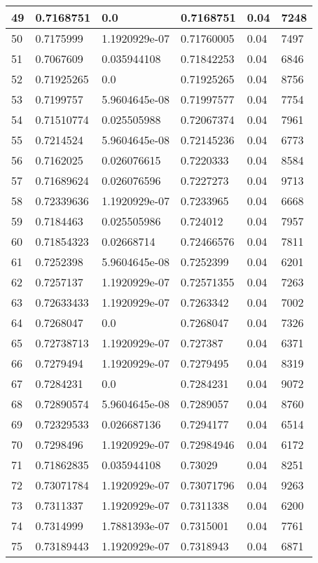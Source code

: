 \begin{longtable}{|l|l|l|l|l|l|}
49 & 0.7168751 & 0.0 & 0.7168751 & 0.04 & 7248 \\ \hline 
50 & 0.7175999 & 1.1920929e-07 & 0.71760005 & 0.04 & 7497 \\ \hline 
51 & 0.7067609 & 0.035944108 & 0.71842253 & 0.04 & 6846 \\ \hline 
52 & 0.71925265 & 0.0 & 0.71925265 & 0.04 & 8756 \\ \hline 
53 & 0.7199757 & 5.9604645e-08 & 0.71997577 & 0.04 & 7754 \\ \hline 
54 & 0.71510774 & 0.025505988 & 0.72067374 & 0.04 & 7961 \\ \hline 
55 & 0.7214524 & 5.9604645e-08 & 0.72145236 & 0.04 & 6773 \\ \hline 
56 & 0.7162025 & 0.026076615 & 0.7220333 & 0.04 & 8584 \\ \hline 
57 & 0.71689624 & 0.026076596 & 0.7227273 & 0.04 & 9713 \\ \hline 
58 & 0.72339636 & 1.1920929e-07 & 0.7233965 & 0.04 & 6668 \\ \hline 
59 & 0.7184463 & 0.025505986 & 0.724012 & 0.04 & 7957 \\ \hline 
60 & 0.71854323 & 0.02668714 & 0.72466576 & 0.04 & 7811 \\ \hline 
61 & 0.7252398 & 5.9604645e-08 & 0.7252399 & 0.04 & 6201 \\ \hline 
62 & 0.7257137 & 1.1920929e-07 & 0.72571355 & 0.04 & 7263 \\ \hline 
63 & 0.72633433 & 1.1920929e-07 & 0.7263342 & 0.04 & 7002 \\ \hline 
64 & 0.7268047 & 0.0 & 0.7268047 & 0.04 & 7326 \\ \hline 
65 & 0.72738713 & 1.1920929e-07 & 0.727387 & 0.04 & 6371 \\ \hline 
66 & 0.7279494 & 1.1920929e-07 & 0.7279495 & 0.04 & 8319 \\ \hline 
67 & 0.7284231 & 0.0 & 0.7284231 & 0.04 & 9072 \\ \hline 
68 & 0.72890574 & 5.9604645e-08 & 0.7289057 & 0.04 & 8760 \\ \hline 
69 & 0.72329533 & 0.026687136 & 0.7294177 & 0.04 & 6514 \\ \hline 
70 & 0.7298496 & 1.1920929e-07 & 0.72984946 & 0.04 & 6172 \\ \hline 
71 & 0.71862835 & 0.035944108 & 0.73029 & 0.04 & 8251 \\ \hline 
72 & 0.73071784 & 1.1920929e-07 & 0.73071796 & 0.04 & 9263 \\ \hline 
73 & 0.7311337 & 1.1920929e-07 & 0.7311338 & 0.04 & 6200 \\ \hline 
74 & 0.7314999 & 1.7881393e-07 & 0.7315001 & 0.04 & 7761 \\ \hline 
75 & 0.73189443 & 1.1920929e-07 & 0.7318943 & 0.04 & 6871 \\ \hline 
\end{longtable}